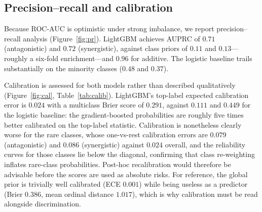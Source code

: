\documentclass{bmcart}
\begin{document}
\subsection*{Precision--recall and calibration}
Because ROC-AUC is optimistic under strong imbalance, we report precision--recall analysis
(Figure~\ref{fig:pr}). LightGBM achieves AUPRC of $0.71$ (antagonistic) and $0.72$ (synergistic),
against class priors of $0.11$ and $0.13$---roughly a six-fold enrichment---and $0.96$ for additive.
The logistic baseline trails substantially on the minority classes ($0.48$ and $0.37$).

Calibration is assessed for both models rather than described qualitatively
(Figure~\ref{fig:cal}, Table~\ref{tab:calib}). LightGBM's top-label expected calibration error is
$0.024$ with a multiclass Brier score of $0.291$, against $0.111$ and $0.449$ for the logistic
baseline: the gradient-boosted probabilities are roughly five times better calibrated on the top-label
statistic. Calibration is nonetheless clearly worse for the rare classes, whose one-vs-rest calibration
errors are $0.079$ (antagonistic) and $0.086$ (synergistic) against $0.024$ overall, and the reliability
curves for those classes lie below the diagonal, confirming that class re-weighting inflates rare-class
probabilities. Post-hoc recalibration would therefore be advisable before the scores are used as
absolute risks. For reference, the global prior is trivially well calibrated (ECE $0.001$) while being
useless as a predictor (Brier $0.386$, mean ordinal distance $1.017$), which is why calibration must be
read alongside discrimination.
\end{document}
